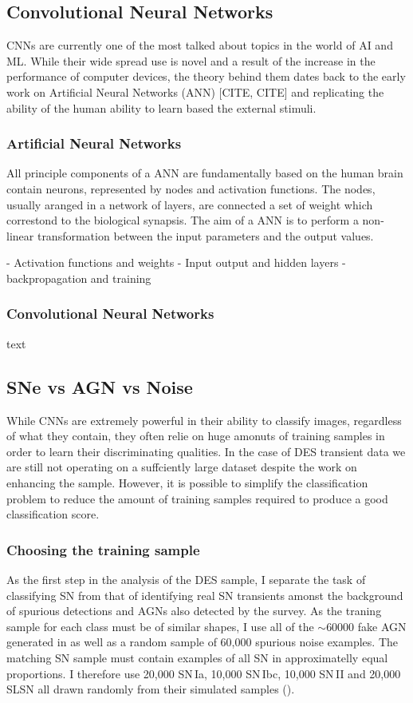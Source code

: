 \subsection{Convolutional Neural Networks} \label{sec:CNN}
CNNs are currently one of the most talked about topics in the world of AI and ML. While their wide spread use is novel and a result of the increase in the performance of computer devices, the theory behind them dates back to the early work on Artificial Neural Networks (ANN) [CITE, CITE] and replicating the ability of the human ability to learn based the external stimuli.

\subsubsection{Artificial Neural Networks}
All principle components of a ANN are fundamentally based on the human brain contain neurons, represented by nodes and activation functions. The nodes, usually aranged in a network of layers, are connected a set of weight which correstond to the biological synapsis. The aim of a ANN is to perform a non-linear transformation between the input parameters and the output values.

- Activation functions and weights
- Input output and hidden layers
- backpropagation and training

\subsubsection{Convolutional Neural Networks}
text

\subsection{SNe vs AGN vs Noise}
While CNNs are extremely powerful in their ability to classify images, regardless of what they contain, they often relie on huge amonuts of training samples in order to learn their discriminating qualities. In the case of DES transient data we are still not operating on a suffciently large dataset despite the work on enhancing the sample. However, it is possible to simplify the classification problem to reduce the amount of training samples required to produce a good classification score.

\subsubsection{Choosing the training sample} \label{sec:AGNNoiseSNSample}
As the first step in the analysis of the DES sample, I separate the task of classifying SN from that of identifying real SN transients amonst the background of spurious detections and AGNs also detected by the survey. As the traning sample for each class must be of similar shapes, I use all of the $\sim60000$ fake AGN generated in  as well as a random sample of 60,000 spurious noise examples. The matching SN sample must contain examples of all SN in approximatelly equal proportions. I therefore use 20,000 SN\,Ia, 10,000 SN\,Ibc, 10,000 SN\,II and 20,000 SLSN all drawn randomly from their simulated samples ().

